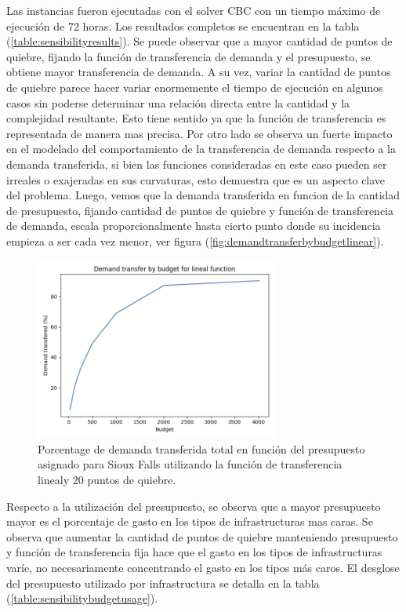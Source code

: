 \documentclass{article}
\begin{document}
  Las instancias fueron ejecutadas con el solver CBC con un tiempo máximo de ejecución de 72 horas. Los resultados completos se encuentran en la tabla (\ref{table:sensibilityresults}). Se puede observar que a mayor cantidad de puntos de quiebre, fijando la función de transferencia de demanda y el presupuesto, se obtiene mayor transferencia de demanda. A su vez, variar la cantidad de puntos de quiebre parece hacer variar enormemente el tiempo de ejecución en algunos casos sin poderse determinar una relación directa entre la cantidad y la complejidad resultante. Esto tiene sentido ya que la función de transferencia es representada de manera mas precisa. Por otro lado se observa un fuerte impacto en el modelado del comportamiento de la transferencia de demanda respecto a la demanda transferida, si bien las funciones consideradas en este caso pueden ser irreales o exajeradas en sus curvaturas, esto demuestra que es un aspecto clave del problema. Luego, vemos que la demanda transferida en funcion de la cantidad de presupuesto, fijando cantidad de puntos de quiebre y función de transferencia de demanda, escala proporcionalmente hasta cierto punto donde su incidencia empieza a ser cada vez menor, ver figura (\ref{fig:demandtransferbybudgetlinear}).

  \begin{figure}[h!]
    \centering
    \includegraphics[width=8cm]{../resources/demand_by_budget_linear.png}
      \caption{Porcentage de demanda transferida total en función del presupuesto asignado para Sioux Falls utilizando la función de transferencia linealy 20 puntos de quiebre.}
    \label{fig:fcatalog}
  \end{figure}

  Respecto a la utilización del presupuesto, se observa que a mayor presupuesto mayor es el porcentaje de gasto en los tipos de infrastructuras mas caras. Se observa que aumentar la cantidad de puntos de quiebre manteniendo presupuesto y función de transferencia fija hace que el gasto en los tipos de infrastructuras varíe, no necesariamente concentrando el gasto en los tipos más caros. El desglose del presupuesto utilizado por infrastructura se detalla en la tabla (\ref{table:sensibilitybudgetusage}).
\end{document}
